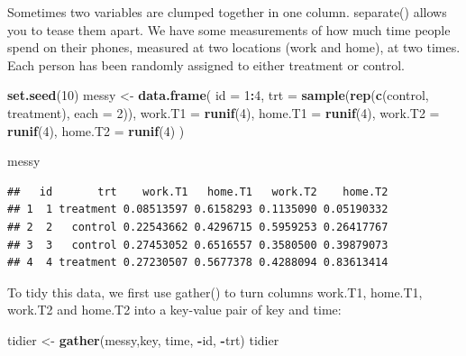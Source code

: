 \documentclass[
]{book}
\newenvironment{Shaded}{\begin{snugshade}}{\end{snugshade}}
\newcommand{\AttributeTok}[1]{\textcolor[rgb]{0.13,0.29,0.53}{#1}}
\newcommand{\DecValTok}[1]{\textcolor[rgb]{0.00,0.00,0.81}{#1}}
\newcommand{\FunctionTok}[1]{\textcolor[rgb]{0.13,0.29,0.53}{\textbf{#1}}}
\newcommand{\NormalTok}[1]{#1}
\newcommand{\OtherTok}[1]{\textcolor[rgb]{0.56,0.35,0.01}{#1}}
\newcommand{\SpecialCharTok}[1]{\textcolor[rgb]{0.81,0.36,0.00}{\textbf{#1}}}
\newcommand{\StringTok}[1]{\textcolor[rgb]{0.31,0.60,0.02}{#1}}
\begin{document}
Sometimes two variables are clumped together in one column. separate() allows you to tease them apart. We have some measurements of how much time people spend on their phones, measured at two locations (work and home), at two times. Each person has been randomly assigned to either treatment or control.

\begin{Shaded}
\begin{Highlighting}[]
\FunctionTok{set.seed}\NormalTok{(}\DecValTok{10}\NormalTok{)}
\NormalTok{messy }\OtherTok{\textless{}{-}} \FunctionTok{data.frame}\NormalTok{(}
  \AttributeTok{id =} \DecValTok{1}\SpecialCharTok{:}\DecValTok{4}\NormalTok{,}
  \AttributeTok{trt =} \FunctionTok{sample}\NormalTok{(}\FunctionTok{rep}\NormalTok{(}\FunctionTok{c}\NormalTok{(}\StringTok{\textquotesingle{}control\textquotesingle{}}\NormalTok{, }\StringTok{\textquotesingle{}treatment\textquotesingle{}}\NormalTok{), }\AttributeTok{each =} \DecValTok{2}\NormalTok{)),}
  \AttributeTok{work.T1 =} \FunctionTok{runif}\NormalTok{(}\DecValTok{4}\NormalTok{),}
  \AttributeTok{home.T1 =} \FunctionTok{runif}\NormalTok{(}\DecValTok{4}\NormalTok{),}
  \AttributeTok{work.T2 =} \FunctionTok{runif}\NormalTok{(}\DecValTok{4}\NormalTok{),}
  \AttributeTok{home.T2 =} \FunctionTok{runif}\NormalTok{(}\DecValTok{4}\NormalTok{)}
\NormalTok{)}
\end{Highlighting}
\end{Shaded}

\begin{Shaded}
\begin{Highlighting}[]
\NormalTok{messy}
\end{Highlighting}
\end{Shaded}

\begin{verbatim}
##   id       trt    work.T1   home.T1   work.T2    home.T2
## 1  1 treatment 0.08513597 0.6158293 0.1135090 0.05190332
## 2  2   control 0.22543662 0.4296715 0.5959253 0.26417767
## 3  3   control 0.27453052 0.6516557 0.3580500 0.39879073
## 4  4 treatment 0.27230507 0.5677378 0.4288094 0.83613414
\end{verbatim}

To tidy this data, we first use gather() to turn columns work.T1, home.T1, work.T2 and home.T2 into a key-value pair of key and time:

\begin{Shaded}
\begin{Highlighting}[]
\NormalTok{tidier }\OtherTok{\textless{}{-}}  \FunctionTok{gather}\NormalTok{(messy,key, time, }\SpecialCharTok{{-}}\NormalTok{id, }\SpecialCharTok{{-}}\NormalTok{trt)}
\NormalTok{tidier}
\end{Highlighting}
\end{Shaded}
\end{document}
